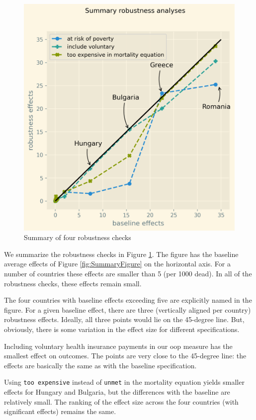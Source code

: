 \documentclass[a4paper,12pt]{article}
\begin{document}
\begin{figure}[htbp]
\centering
\includegraphics[width=.9\linewidth]{./figures/robustness_summary.png}
\caption{\label{fig:robustness_summary}Summary of four robustness checks}
\end{figure}

We summarize the robustness checks in Figure \ref{fig:robustness_summary}. The figure has the baseline average effects of Figure \ref{fig:SummaryFigure} on the horizontal axis. For a number of countries these effects are smaller than 5 (per 1000 dead). In all of the robustness checks, these effects remain small.

The four countries with baseline effects exceeding five are explicitly named in the figure. For a given baseline effect, there are three (vertically aligned per country) robustness effects. Ideally, all three points would lie on the 45-degree line. But, obviously, there is some variation in the effect size for different specifications.

Including voluntary health insurance payments in our oop measure has the smallest effect on outcomes. The points are very close to the 45-degree line: the effects are basically the same as with the baseline specification.

Using \texttt{too expensive} instead of \texttt{unmet} in the mortality equation yields smaller effects for Hungary and Bulgaria, but the differences with the baseline are relatively small. The ranking of the effect size across the four countries (with significant effects) remains the same.
\end{document}
